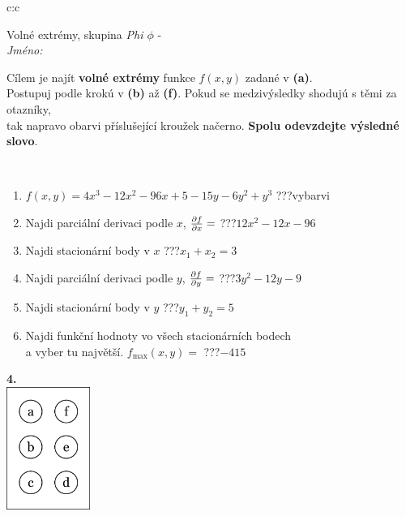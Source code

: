 \documentclass[10pt]{report}
\begin{document}
\begin{tabular}{c:c}
\begin{minipage}[c][104.5mm][t]{0.5\linewidth}
\begin{center}
\vspace{7mm}
{\huge Volné extrémy, skupina \textit{Phi $\phi$} -}\\[5mm]
\textit{Jméno:}\phantom{xxxxxxxxxxxxxxxxxxxxxxxxxxxxxxxxxxxxxxxxxxxxxxxxxxxxxxxxxxxxxxxxx}\\[5mm]
\begin{minipage}{0.95\linewidth}
\begin{center}
Cílem je najít \textbf{volné extrémy} funkce $f(x,y)$ zadané v \textbf{(a)}.\\Postupuj podle krokú v \textbf{(b)} až \textbf{(f)}. Pokud se medzivýsledky shodujú s těmi za otazníky,\\tak napravo obarvi příslušející kroužek načerno. \textbf{Spolu odevzdejte výsledné slovo}.
\end{center}
\end{minipage}
\\[1mm]
\begin{minipage}{0.79\linewidth}
\begin{center}
\begin{varwidth}{\linewidth}
\begin{enumerate}
\normalsize
\item $f(x,y)=4x^3-12x^2-96x+5-15y-6y^2+y^3$\quad \dotfill\; ???\;\dotfill \quad vybarvi
\item Najdi parciální derivaci podle $x$, $\pdv{f}{x}=$\quad \dotfill\; ???\;\dotfill \quad $12x^2-12x-96$
\item Najdi stacionární body v $x$\quad \dotfill\; ???\;\dotfill \quad $x_1+x_2=3$
\item Najdi parciální derivaci podle $y$, $\pdv{f}{y}=$\quad \dotfill\; ???\;\dotfill \quad $3y^2-12y-9$
\item Najdi stacionární body v $y$\quad \dotfill\; ???\;\dotfill \quad $y_1+y_2=5$
\item Najdi funkční hodnoty vo všech stacionárních bodech \\ \phantom{xxxxxx} a vyber tu najvětší. $f_{\text{max}}(x,y)=$\quad \dotfill\; ???\;\dotfill \quad $-415$
\end{enumerate}
\end{varwidth}
\end{center}
\end{minipage}
\begin{minipage}{0.20\linewidth}
\begin{center}
{\Huge\bfseries 4.} \\[2mm]
\includegraphics[height=40mm]{../images/braille.png}

\end{center}
\end{minipage}
\end{center}
\end{minipage}
\end{tabular}
\end{document}
